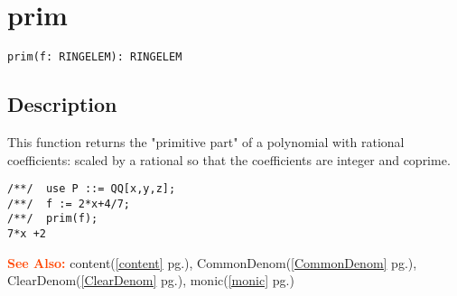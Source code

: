 \documentclass[a4paper]{mybook}
\newenvironment{command}{}{} %
\newcommand\SeeAlso{\par\textcolor{OrangeRed}{\textbf{\large See Also: }}}
\begin{document}
\section{prim}
\label{prim}
\begin{command} %


\begin{Verbatim}[label=syntax, rulecolor=\color{MidnightBlue},
frame=single]
prim(f: RINGELEM): RINGELEM
\end{Verbatim}


\subsection*{Description}

This function returns the "primitive part" of a polynomial with
rational coefficients: scaled by a rational so that the coefficients
are integer and coprime.
\begin{Verbatim}[label=example, rulecolor=\color{PineGreen}, frame=single]
/**/  use P ::= QQ[x,y,z];
/**/  f := 2*x+4/7;
/**/  prim(f);
7*x +2
\end{Verbatim}


\SeeAlso %
  content(\ref{content} pg.\pageref{content}), 
    CommonDenom(\ref{CommonDenom} pg.\pageref{CommonDenom}), 
    ClearDenom(\ref{ClearDenom} pg.\pageref{ClearDenom}), 
    monic(\ref{monic} pg.\pageref{monic})
\end{command} %
\end{document}
